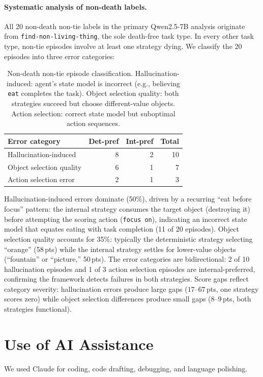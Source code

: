 \documentclass[11pt]{article}
\begin{document}
\paragraph{Systematic analysis of non-death labels.}
All 20 non-death non-tie labels in the primary Qwen2.5-7B analysis originate from \texttt{find-non-living-thing}, the sole death-free task type. In every other task type, non-tie episodes involve at least one strategy dying. We classify the 20 episodes into three error categories:

\begin{table}[h]
\centering
\small
\begin{tabular}{@{}lrrr@{}}
\toprule
Error category & Det-pref & Int-pref & Total \\
\midrule
Hallucination-induced & 8 & 2 & 10 \\
Object selection quality & 6 & 1 & 7 \\
Action selection error & 2 & 1 & 3 \\
\bottomrule
\end{tabular}
\caption{Non-death non-tie episode classification. Hallucination-induced: agent's state model is incorrect (e.g., believing \texttt{eat} completes the task). Object selection quality: both strategies succeed but choose different-value objects. Action selection: correct state model but suboptimal action sequences.}
\label{tab:non-death-taxonomy}
\end{table}

\noindent Hallucination-induced errors dominate (50\%), driven by a recurring ``eat before focus'' pattern: the internal strategy consumes the target object (destroying it) before attempting the scoring action (\texttt{focus on}), indicating an incorrect state model that equates eating with task completion (11 of 20 episodes). Object selection quality accounts for 35\%: typically the deterministic strategy selecting ``orange'' (58\,pts) while the internal strategy settles for lower-value objects (``fountain'' or ``picture,'' 50\,pts). The error categories are bidirectional: 2 of 10 hallucination episodes and 1 of 3 action selection episodes are internal-preferred, confirming the framework detects failures in both strategies. Score gaps reflect category severity: hallucination errors produce large gaps ($17$--$67$\,pts, one strategy scores zero) while object selection differences produce small gaps ($8$--$9$\,pts, both strategies functional).

\section{Use of AI Assistance}
We used Claude for coding, code drafting, debugging, and language polishing.
\end{document}
